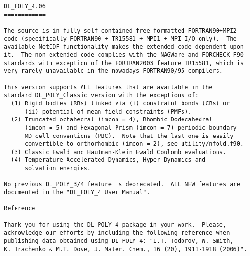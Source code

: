 \label{readme}
\begin{verbatim}
DL_POLY_4.06
============

The source is in fully self-contained free formatted FORTRAN90+MPI2
code (specifically FORTRAN90 + TR15581 + MPI1 + MPI-I/O only).  The
available NetCDF functionality makes the extended code dependent upon
it.  The non-extended code complies with the NAGWare and FORCHECK F90
standards with exception of the FORTRAN2003 feature TR15581, which is
very rarely unavailable in the nowadays FORTRAN90/95 compilers.

This version supports ALL features that are available in the
standard DL_POLY_Classic version with the exceptions of:
  (1) Rigid bodies (RBs) linked via (i) constraint bonds (CBs) or
      (ii) potential of mean field constraints (PMFs).
  (2) Truncated octahedral (imcon = 4), Rhombic Dodecahedral
      (imcon = 5) and Hexagonal Prism (imcon = 7) periodic boundary
      MD cell conventions (PBC).  Note that the last one is easily
      convertible to orthorhombic (imcon = 2), see utility/nfold.f90.
  (3) Classic Ewald and Hautman-Klein Ewald Coulomb evaluations.
  (4) Temperature Accelerated Dynamics, Hyper-Dynamics and
      solvation energies.

No previous DL_POLY_3/4 feature is deprecated.  ALL NEW features are
documented in the "DL_POLY_4 User Manual".

Reference
---------
Thank you for using the DL_POLY_4 package in your work.  Please,
acknowledge our efforts by including the following reference when
publishing data obtained using DL_POLY_4: "I.T. Todorov, W. Smith,
K. Trachenko & M.T. Dove, J. Mater. Chem., 16 (20), 1911-1918 (2006)".


\end{verbatim}
